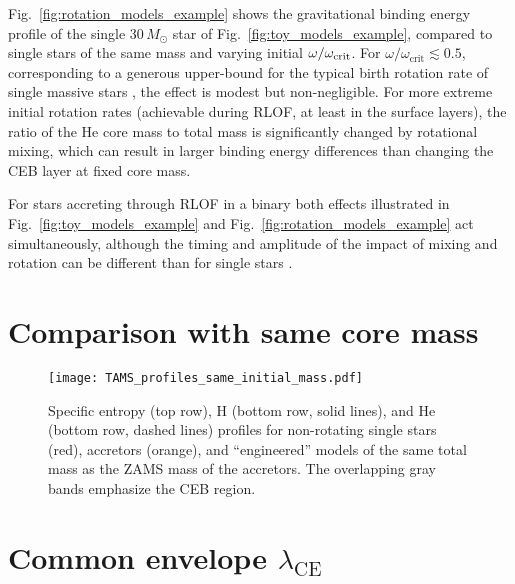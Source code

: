 \documentclass[twocolumn,twocolappendix,trackchanges]{aastex63}
\DeclareRobustCommand{\Figref}[1]{Fig.~\ref{#1}}
\begin{document}
\Figref{fig:rotation_models_example} shows the gravitational binding
energy profile of the single $30\,M_\odot$ star of
\Figref{fig:toy_models_example}, compared to single stars of the same
mass and varying initial $\omega/\omega_{\rm crit}$. %
For $\omega/\omega_\mathrm{crit}\lesssim 0.5$, corresponding to a
generous upper-bound for the typical birth rotation rate of single
massive stars \citep[e.g.,][]{ramirez-agudelo:2015}, the effect is
modest but non-negligible. For more extreme initial rotation rates
(achievable during RLOF, at least in the surface layers), the ratio of
the He core mass to total mass is significantly changed by rotational
mixing, which can result in larger binding energy differences than
changing the CEB layer at fixed core mass.


For stars accreting through RLOF in a binary both
effects illustrated in \Figref{fig:toy_models_example} and
\Figref{fig:rotation_models_example} act simultaneously, although the
timing and amplitude of the impact of mixing and rotation can be
different than for single stars \citep[e.g.,][]{renzo:2021zoph}.


\section{Comparison with same core mass}

\begin{figure*}[htbp]
  \centering
  \texttt{[image: TAMS\_profiles\_same\_initial\_mass.pdf]}
  \caption{Specific entropy (top row), H (bottom row, solid lines),
    and He (bottom row, dashed lines) profiles for non-rotating single
    stars (red), accretors (orange), and ``engineered'' models of the
    same total mass as the ZAMS mass of the accretors. The overlapping
    gray bands emphasize the CEB region.}
  \label{fig:TAMS_profiles_same_initial_mass}
\end{figure*}


\section{Common envelope $\lambda_\mathrm{CE}$}
\label{sec:pop_synth_app}
\end{document}
